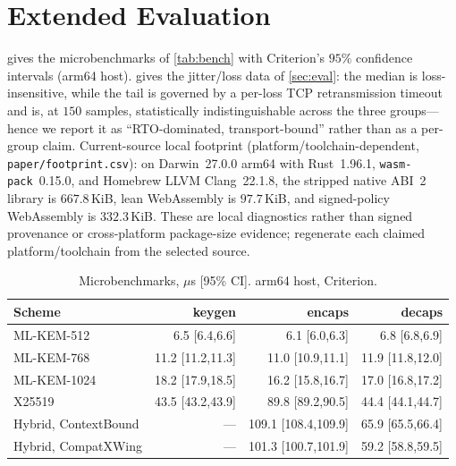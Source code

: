 \documentclass[journal]{IEEEtran}
\newcommand{\code}[1]{\texttt{\small #1}}
\begin{document}
\section{Extended Evaluation}\label{app:eval}
 gives the microbenchmarks of \cref{tab:bench} with Criterion's
$95\%$ confidence intervals (arm64 host).  gives the jitter/loss data of
\cref{sec:eval}: the median is loss-insensitive, while the tail is governed by a per-loss TCP
retransmission timeout and is, at $150$ samples, statistically indistinguishable across the three
groups---hence we report it as ``RTO-dominated, transport-bound'' rather than as a per-group claim.
Current-source local footprint (platform/toolchain-dependent,
\code{paper/footprint.csv}): on Darwin~27.0.0 arm64 with Rust~1.96.1,
\code{wasm-pack}~0.15.0, and Homebrew LLVM Clang~22.1.8, the stripped native ABI~2
library is $667.8$\,KiB, lean WebAssembly is $97.7$\,KiB, and signed-policy
WebAssembly is $332.3$\,KiB. These are local diagnostics rather than signed
provenance or cross-platform package-size evidence; regenerate each claimed
platform/toolchain from the selected source.

\begin{table}[t]\centering\scriptsize
\setlength{\tabcolsep}{3pt}\renewcommand{\arraystretch}{1.15}
\caption{Microbenchmarks, $\mu$s [95\% CI]. arm64 host, Criterion.}\label{tab:bench-ci}
\begin{tabular}{@{}l r r r@{}}
\toprule
\textbf{Scheme} & \textbf{keygen} & \textbf{encaps} & \textbf{decaps} \\
\midrule
ML-KEM-512  & 6.5 [6.4,6.6]    & 6.1 [6.0,6.3]    & 6.8 [6.8,6.9] \\
ML-KEM-768  & 11.2 [11.2,11.3] & 11.0 [10.9,11.1] & 11.9 [11.8,12.0] \\
ML-KEM-1024 & 18.2 [17.9,18.5] & 16.2 [15.8,16.7] & 17.0 [16.8,17.2] \\
X25519      & 43.5 [43.2,43.9] & 89.8 [89.2,90.5] & 44.4 [44.1,44.7] \\
Hybrid, ContextBound & --- & 109.1 [108.4,109.9] & 65.9 [65.5,66.4] \\
Hybrid, CompatXWing  & --- & 101.3 [100.7,101.9] & 59.2 [58.8,59.5] \\
\bottomrule
\end{tabular}
\end{table}
\end{document}
